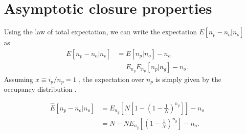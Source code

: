 \documentclass[review]{elsarticle}
\newcommand{\dslash}{/\!\!/}
\newcommand{\sgcomment}[1]{{\color{red}{SG: #1}}}
\begin{document}
\section{Asymptotic closure properties}
\label{sec:asympt}








Using the law of total expectation, we can write the expectation $E[n_p-n_o | n_o]$ as 
\begin{equation*}
  \begin{aligned}
    \label{eq:lineages-approx}
    E[n_p-n_o | n_o] &=        E[n_p | n_o]       - n_o \\
                     &=E_{n_g} E_{n_p}[n_p | n_g] - n_o.
  \end{aligned}
\end{equation*}
Assuming $x\equiv i_p/n_p=1$ \sgcomment{population or sample?}, the expectation over $n_p$ is simply given by the occupancy distribution \cite{Wakeley2009}.

\begin{equation*}
  \begin{aligned}
    \label{eq:lineages-derive}
    \hat{E}[n_p -n_o | n_o]
    & =   E_{n_g}\left[N\left[1-\left(1 - \frac{1}{N} \right)^{n_g} \right]\right]- n_o\\
    & =   N-N  E_{n_g}\left[\left(1 - \frac{1}{N} \right)^{n_g} \right] -n_o. 
  \end{aligned}
\end{equation*}
\end{document}
